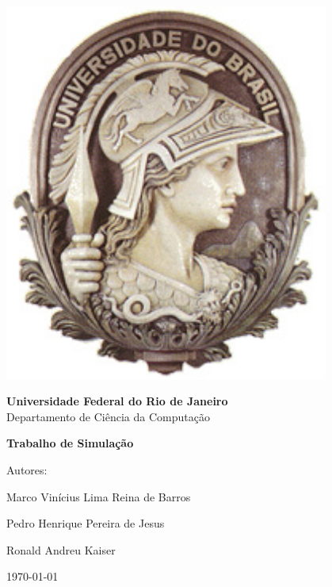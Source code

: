 \documentclass[12pt, a4paper, onecolumn]{report}
\begin{document}
\begin{titlepage}

\begin{minipage}{0.2\linewidth}
 \includegraphics[width=0.8\textwidth]{minerva.jpg}
\end{minipage}
\begin{minipage}{0.8\linewidth}
 \textbf{Universidade Federal do Rio de Janeiro}\\
 Departamento de Ciência da Computação\\
\end{minipage}

\begin{center}
\vspace{2cm}
\Large
\textbf{Trabalho de Simulação}
\vspace{0.5cm}
\normalsize
\end{center}
\vfill
\begin{flushright}
Autores:

\vspace{0.125cm}

Marco Vinícius Lima Reina de Barros

\vspace{0.25cm}

Pedro Henrique Pereira de Jesus

\vspace{0.25cm}

Ronald Andreu Kaiser

\vspace{0.70cm}

\today
\end{flushright}
\vspace{2cm}

\end{titlepage}

\tableofcontents







\end{document}
